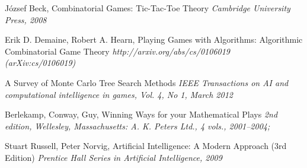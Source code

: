 \begin{thebibliography}{9}


József Beck, Combinatorial Games: Tic-Tac-Toe Theory
\emph{Cambridge University Press, 2008}

Erik D. Demaine, Robert A. Hearn, Playing Games with Algorithms: Algorithmic Combinatorial Game Theory
\emph{http://arxiv.org/abs/cs/0106019 (arXiv:cs/0106019)}

A Survey of Monte Carlo Tree Search Methods
\emph{IEEE Transactions on AI and computational intelligence in games, Vol. 4, No 1, March 2012}

Berlekamp, Conway, Guy, Winning Ways for your Mathematical Plays
\emph{2nd edition, Wellesley, Massachusetts: A. K. Peters Ltd., 4 vols., 2001–2004;}

Stuart Russell, Peter Norvig, Artificial Intelligence: A Modern Approach (3rd Edition) 
\emph{Prentice Hall Series in Artificial Intelligence, 2009}


\end{thebibliography}
